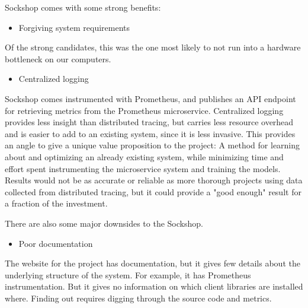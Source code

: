 Sockshop comes with some strong benefits:

\begin{itemize}
    \item Forgiving system requirements
\end{itemize}

Of the strong candidates, this was the one most likely to not run into a hardware bottleneck on our computers. 

\begin{itemize}
    \item Centralized logging
\end{itemize}
Sockshop comes instrumented with Prometheus, and publishes an API endpoint for retrieving metrics from the Prometheus microservice. Centralized logging provides less insight than distributed tracing, but carries less resource overhead and is easier to add to an existing system, since it is less invasive. 
This provides an angle to give a unique value proposition to the project: A method for learning about and optimizing an already existing system, while minimizing time and effort spent instrumenting the microservice system and training the models. Results would not be as accurate or reliable as more thorough projects using data collected from distributed tracing, but it could provide a "good enough" result for a fraction of the investment.

There are also some major downsides to the Sockshop.

\begin{itemize}
    \item Poor documentation
\end{itemize}
The website for the project \cite*{Weaveworks} has documentation, but it gives few details about the underlying structure of the system. 
For example, it has Prometheus instrumentation. But it gives no information on which client libraries are installed where. Finding out requires digging through the source code and metrics.
